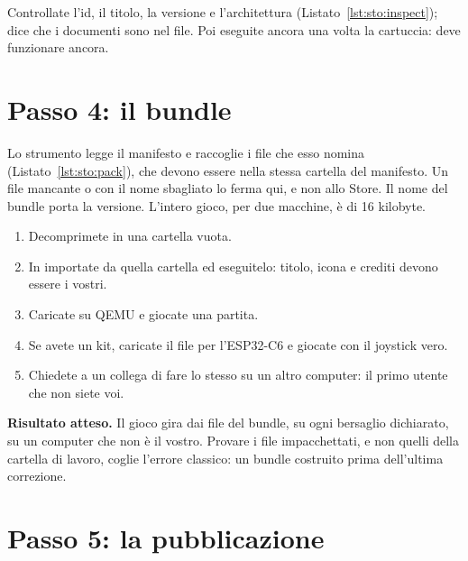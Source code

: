 Controllate l'id, il titolo, la versione e l'architettura
(Listato~\ref{lst:sto:inspect});  dice che i documenti
sono nel file. Poi eseguite ancora una volta la cartuccia: deve funzionare
ancora.

\section{Passo 4: il bundle}


Lo strumento legge il manifesto e raccoglie i file che esso nomina
(Listato~\ref{lst:sto:pack}), che devono essere nella stessa cartella del
manifesto. Un file mancante o con il nome sbagliato lo ferma qui, e non allo
Store. Il nome del bundle porta la versione. L'intero gioco, per due macchine,
è di 16 kilobyte.

\begin{prgcheck}
\begin{enumerate}[nosep]
\item Decomprimete  in una cartella vuota.
\item In \prgqt importate  da quella cartella ed
  eseguitelo: titolo, icona e crediti devono essere i vostri.
\item Caricate  su QEMU e giocate una partita.
\item Se avete un kit, caricate il file per l'ESP32-C6 e giocate con il
  joystick vero.
\item Chiedete a un collega di fare lo stesso su un altro computer: il primo
  utente che non siete voi.
\end{enumerate}
\textbf{Risultato atteso.} Il gioco gira dai file del bundle, su ogni bersaglio
dichiarato, su un computer che non è il vostro. Provare i file impacchettati,
e non quelli della cartella di lavoro, coglie l'errore classico: un bundle
costruito prima dell'ultima correzione.
\end{prgcheck}

\section{Passo 5: la pubblicazione}


